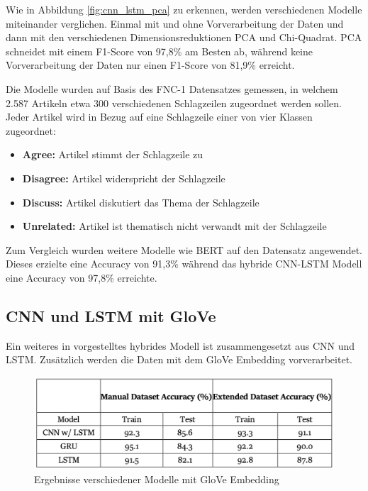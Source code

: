 Wie in Abbildung \ref{fig:cnn_lstm_pca} zu erkennen, werden verschiedenen Modelle miteinander verglichen. Einmal mit und ohne Vorverarbeitung
der Daten und dann mit den verschiedenen Dimensionsreduktionen PCA und Chi-Quadrat.
PCA schneidet mit einem F1-Score von 97,8\% am Besten ab, während keine Vorverarbeitung der Daten nur einen F1-Score von 81,9\% erreicht.

Die Modelle wurden auf Basis des FNC-1 Datensatzes gemessen, in welchem 2.587 Artikeln etwa 300 verschiedenen Schlagzeilen zugeordnet werden sollen.
Jeder Artikel wird in Bezug auf eine Schlagzeile einer von vier Klassen zugeordnet:

\begin{itemize}
    \item \textbf{Agree:} Artikel stimmt der Schlagzeile zu
    \item \textbf{Disagree:} Artikel widerspricht der Schlagzeile
    \item \textbf{Discuss:} Artikel diskutiert das Thema der Schlagzeile
    \item \textbf{Unrelated:} Artikel ist thematisch nicht verwandt mit der Schlagzeile
\end{itemize}

Zum Vergleich wurden weitere Modelle wie BERT auf den Datensatz angewendet.
Dieses erzielte eine Accuracy von 91,3\% während das hybride CNN-LSTM Modell eine Accuracy von 97,8\% erreichte.

\subsection{CNN und LSTM mit GloVe}

Ein weiteres in \cite{Buddhadev2025} vorgestelltes hybrides Modell ist zusammengesetzt aus CNN und LSTM. Zusätzlich werden die Daten
mit dem GloVe Embedding vorverarbeitet.

\begin{figure}[htbp]
    \begin{center}
    \includegraphics[scale=0.5]{static/cnn_lstm_glove.png}
    \caption{\label{fig:cnn_lstm_glove} Ergebnisse verschiedener Modelle mit GloVe Embedding \cite{Buddhadev2025}}
    \end{center}
\end{figure}

